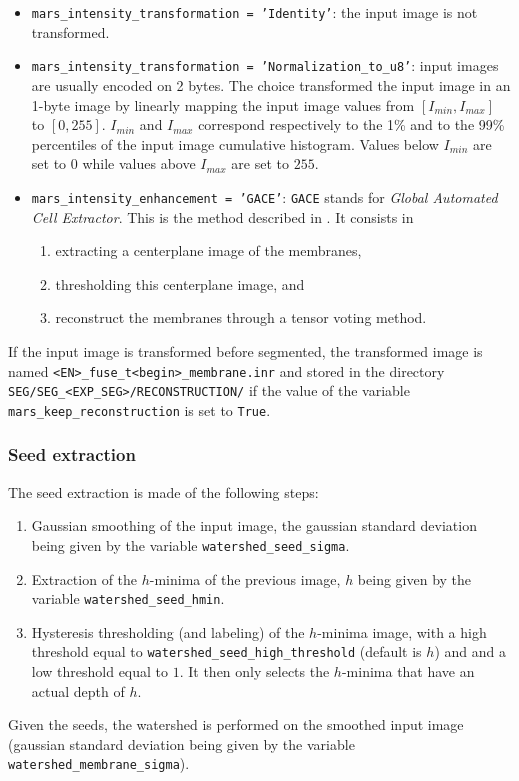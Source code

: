 \begin{itemize}
\itemsep -1ex
\item \texttt{mars\_intensity\_transformation = 'Identity'}: the input image is not transformed. 
  \item \texttt{mars\_intensity\_transformation = 'Normalization\_to\_u8'}: input images are usually encoded on 2 bytes. The choice transformed the input image in an 1-byte image by linearly mapping the input image values from $[I_{min}, I_{max}]$ to $[0, 255]$. $I_{min}$ and $I_{max}$ correspond respectively to the 1\% and to the 99\% percentiles of the input image cumulative histogram. Values below $I_{min}$ are set to $0$ while values above $I_{max}$ are set to $255$.
  \item \texttt{mars\_intensity\_enhancement = 'GACE'}: \texttt{GACE}
    stands for \textit{Global Automated Cell Extractor}. This is the
    method described in \cite{michelin:hal-00915000,michelin:tel-01451608}. It consists in
    \begin{enumerate}
    \itemsep -1ex
    \item  extracting a centerplane image of the membranes,
    \item  \label{it:mars:gace:threshold} thresholding this centerplane image, and 
    \item  \label{it:mars:gace:tensorvoting} reconstruct the membranes through a tensor voting method.
    \end{enumerate}
\end{itemize}

If the input image is transformed before segmented, the transformed image is named \texttt{<EN>\_fuse\_t<begin>\_membrane.inr} and stored in the directory \texttt{SEG/SEG\_<EXP\_SEG>/RECONSTRUCTION/} if the value of the variable \texttt{mars\_keep\_reconstruction} is set to \texttt{True}.

\subsubsection{Seed extraction}
\label{sec:cli:mars:seed:extraction}

The seed extraction is made of the following steps:
\begin{enumerate}
\itemsep -1ex
\item Gaussian smoothing of the input image, the gaussian standard deviation being given by the variable \texttt{watershed\_seed\_sigma}.
\item Extraction of the $h$-minima of the previous image, $h$  being given by the variable \texttt{watershed\_seed\_hmin}.
\item Hysteresis thresholding (and labeling)  of the $h$-minima image, with a high threshold equal to \texttt{watershed\_seed\_high\_threshold} (default is $h$)  and and a low threshold equal to $1$. It then only selects the $h$-minima that have an actual depth of $h$.
\end{enumerate}
Given the seeds, the watershed is performed on the smoothed input image (gaussian standard deviation being given by the variable \texttt{watershed\_membrane\_sigma}).


